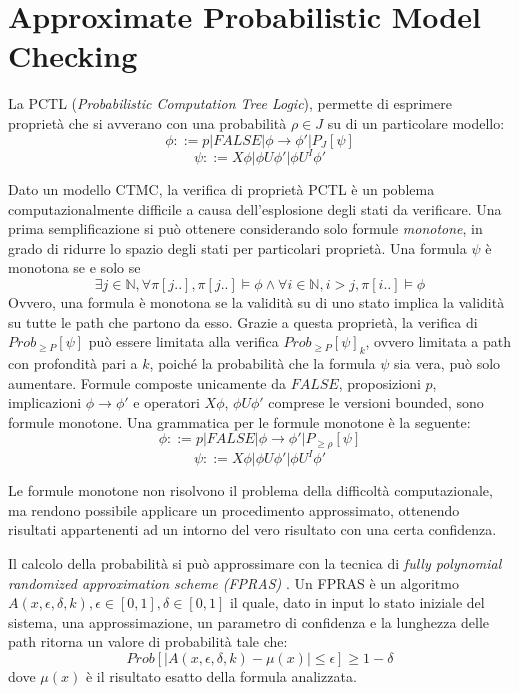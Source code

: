 \section{Approximate Probabilistic Model Checking}
\label{sec:APMC}
La PCTL (\emph{Probabilistic Computation Tree Logic}), permette di esprimere
proprietà che si avverano con una probabilità $\rho \in J$ su di un particolare
modello:
 \[
\phi ::= p | FALSE | \phi \rightarrow \phi' | P_J[\psi]
\]
\[
\psi ::= X \phi | \phi U \phi' | \phi U^I \phi'
\]

Dato un modello CTMC, la verifica di proprietà PCTL è un poblema
computazionalmente difficile a causa dell'esplosione degli stati da
verificare. Una prima semplificazione si può ottenere considerando solo
formule \emph{monotone}, in grado di ridurre lo spazio degli stati per
particolari proprietà. Una formula $\psi$ è monotona se e solo se \[\exists j
\in \mathbb{N}, \forall \pi{}[j..], \pi{}[j..]\models \phi \wedge \forall i \in
\mathbb{N}, i > j , \pi{}[i..]\models \phi \] 
Ovvero, una formula è monotona se la validità su di uno stato implica la
validità su tutte le path che partono da esso. Grazie a questa proprietà, la
verifica di $Prob_{\geq P}[ \psi ]$ può essere limitata alla verifica
$Prob_{\geq P}[ \psi ]_k$, ovvero limitata a path con profondità pari a $k$,
poiché la probabilità che la formula $\psi$ sia vera, può solo aumentare.
Formule composte unicamente da $FALSE$, proposizioni $p$, implicazioni $\phi
\rightarrow \phi{}'$ e operatori $X \phi$, $\phi U \phi{}'$ comprese le versioni bounded, sono formule monotone. Una grammatica per le formule monotone è la seguente:
 \[
\phi ::= p | FALSE | \phi \rightarrow \phi' | P_{\geq \rho}[\psi]
\]
\[
\psi ::= X \phi | \phi U \phi' | \phi U^I \phi'
\]

Le formule monotone non risolvono il problema della difficoltà
computazionale, ma rendono possibile applicare un procedimento approssimato,
ottenendo risultati appartenenti ad un intorno del vero risultato con una certa confidenza.

Il calcolo della probabilità si può approssimare con la tecnica di \emph{fully
polynomial randomized approximation scheme (FPRAS)} \cite{DBLP:conf/vmcai/2004}.
Un FPRAS è un algoritmo $A(x, \epsilon, \delta, k), \epsilon \in [0, 1], \delta
\in [0, 1]$ il quale, dato in input lo stato iniziale del sistema, una approssimazione, un parametro di confidenza e la lunghezza delle path
ritorna un valore di probabilità tale che:
\[
	Prob[ \mid A(x,\epsilon,\delta, k) - \mu(x) \mid \leq \epsilon] \geq 1 - \delta
\]
dove $\mu(x)$ è il risultato esatto della formula analizzata.

